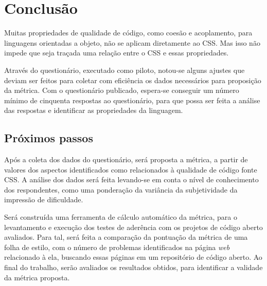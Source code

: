 %
%

\chapter{Conclusão}

Muitas propriedades de qualidade de código, como coesão e acoplamento, para linguagens orientadas a objeto, não se aplicam diretamente ao CSS. Mas isso não impede que seja traçada uma relação entre o CSS e essas propriedades.

Através do questionário, executado como piloto, notou-se alguns ajustes que deviam ser feitos para coletar com eficiência os dados necessários para proposição da métrica. Com o questionário publicado, espera-se conseguir um número mínimo de cinquenta respostas ao questionário, para que possa ser feita a análise das respostas e identificar as propriedades da linguagem.

\section{Próximos passos}

Após a coleta dos dados do questionário, será proposta a métrica, a partir de valores dos aspectos identificados como relacionados à qualidade de código fonte CSS. A análise dos dados será feita levando-se em conta o nível de conhecimento dos respondentes, como uma ponderação da variância da subjetividade da impressão de dificuldade.

Será construída uma ferramenta de cálculo automático da métrica, para o levantamento e execução dos testes de aderência com os projetos de código aberto avaliados. Para tal, será feita a comparação da pontuação da métrica de uma folha de estilo, com o número de problemas identificados na página \textit{web} relacionado à ela, buscando essas páginas em um repositório de código aberto. Ao final do trabalho, serão avaliados os resultados obtidos, para identificar a validade da métrica proposta.